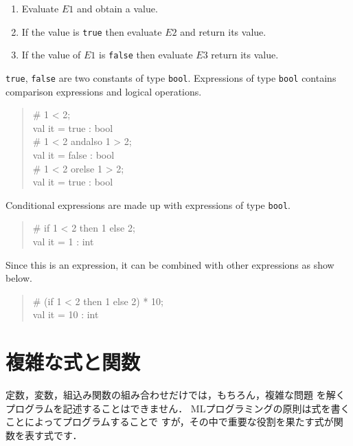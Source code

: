 \documentclass{jbook}
\newif\ifjp
\newcommand{\txt}[2]{#1}
\newenvironment{program}{\begin{quote}\begin{tt}}%
                        {\end{tt}\end{quote}}
\begin{document}
\begin{enumerate}
\item Evaluate $E1$ and obtain a value.
\item If the value is {\tt true} then evaluate $E2$ and return its value.
\item If the value of $E1$ is {\tt false} then evaluate $E3$ return its value.
\end{enumerate}
	{\tt true}, {\tt false} are two constants of type {\tt bool}.
	Expressions of type {\tt bool} contains comparison expressions
and logical operations.
\begin{program}
\# 1 < 2;\\
val it = true : bool\\
\# 1 < 2 andalso 1 > 2;\\
val it = false : bool\\
\# 1 < 2 orelse 1 > 2;\\
val it = true : bool
\end{program}
	Conditional expressions are made up with expressions of type
{\tt bool}.
\begin{program}
\# if 1 < 2 then 1 else 2;\\
val it = 1 : int
\end{program}
	Since this is an expression, it can be combined with other
expressions as show below.
\begin{program}
\# (if 1 < 2 then 1 else 2) * 10;\\
val it = 10 : int
\end{program}
\fi%


\section{
\txt{複雑な式と関数}
{Compound expressions and function definitions}
}
\label{sec:tutorialFunction}

\ifjp%
	定数，変数，組込み関数の組み合わせだけでは，もちろん，複雑な問題
を解くプログラムを記述することはできません． 
	MLプログラミングの原則は式を書くことによってプログラムすることで
すが，その中で重要な役割を果たす式が関数を表す式です．
\end{document}
